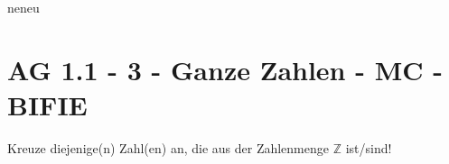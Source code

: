 neneu
\section{AG 1.1 - 3 - Ganze Zahlen - MC - BIFIE}

\begin{beispiel}[AG 1.1]{1} %
Kreuze diejenige(n) Zahl(en) an, die aus der Zahlenmenge $\mathbb{Z}$ ist/sind!
\end{beispiel}
